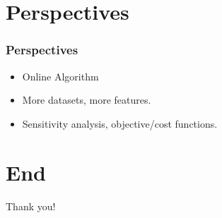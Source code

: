 \documentclass{beamer}
\begin{document}
\section{Perspectives}
\label{sec:perspectives}
\begin{frame}
\frametitle{Perspectives}

\begin{itemize}
\item Online Algorithm
\item More datasets, more features.
\item Sensitivity analysis, objective/cost functions.
\end{itemize}

\end{frame}


\section*{End}
\begin{frame}

  \Huge{\centerline{Thank you!}}
\end{frame}
\end{document}
